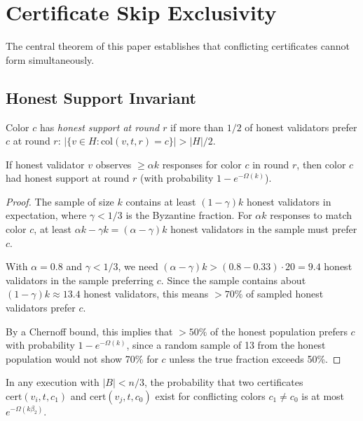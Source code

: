 \section{Certificate Skip Exclusivity}

\label{sec:cse}

The central theorem of this paper establishes that conflicting certificates cannot
form simultaneously.

\subsection{Honest Support Invariant}

\begin{definition}
Color $c$ has \emph{honest support at round $r$} if more than $1/2$ of honest validators
prefer $c$ at round $r$: $|\{v \in H : \text{col}(v, t, r) = c\}| > |H|/2$.
\end{definition}

\begin{lemma}
\label{lem:honest-support}
If honest validator $v$ observes $\geq \alpha k$ responses for color $c$ in round $r$,
then color $c$ had honest support at round $r$ (with probability $1 - e^{-\Omega(k)}$).
\end{lemma}

\begin{proof}
The sample of size $k$ contains at least $(1 - \gamma)k$ honest validators in expectation,
where $\gamma < 1/3$ is the Byzantine fraction. For $\alpha k$ responses to match color $c$,
at least $\alpha k - \gamma k = (\alpha - \gamma)k$ honest validators in the sample must
prefer $c$.

With $\alpha = 0.8$ and $\gamma < 1/3$, we need $(\alpha - \gamma)k > (0.8 - 0.33) \cdot 20 = 9.4$
honest validators in the sample preferring $c$. Since the sample contains about
$(1-\gamma)k \approx 13.4$ honest validators, this means $> 70\%$ of sampled honest
validators prefer $c$.

By a Chernoff bound, this implies that $> 50\%$ of the honest population prefers $c$
with probability $1 - e^{-\Omega(k)}$, since a random sample of 13 from the honest
population would not show 70\% for $c$ unless the true fraction exceeds 50\%.
\end{proof}

\begin{theorem}
\label{thm:cse}
In any execution with $|B| < n/3$, the probability that two certificates
$\text{cert}(v_i, t, c_1)$ and $\text{cert}(v_j, t, c_0)$ exist for conflicting
colors $c_1 \neq c_0$ is at most $e^{-\Omega(k\beta_2)}$.
\end{theorem}

